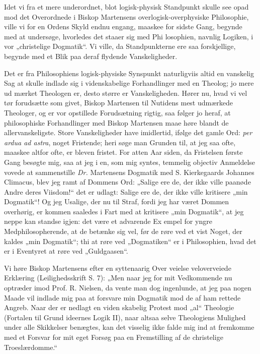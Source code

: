 \documentclass[12pt]{book}
\newcommand{\opage}[1]{\marginnote{\footnotesize\textit{[#1]}}}
\begin{document}
Idet vi fra et mere underordnet, blot logisk-physisk
Standpunkt skulle see opad mod det Overordnede i Biskop
Martensens overlogisk-overphysiske Philosophie, ville vi for
en Ordens Skyld endnu engang, maaskee for sidste Gang,
begynde med at undersøge, hvorledes det staaer sig med Phi\-%
losophien, navnlig Logiken, i vor „christelige Dogmatik“. Vi
ville, da Standpunkterne ere saa forskjellige, begynde med et
Blik paa deraf flydende Vanskeligheder.

Det er fra Philosophiens logisk-physiske Synspunkt
naturligviis altid en vanskelig Sag at skulle indlade sig i
videnskabelige Forhandlinger med en Theolog; jo mere ud\-%
mærket Theologen er, desto større er Vanskeligheden. Hører
nu, hvad vi vel tør forudsætte som givet, Biskop Martensen
til Nutidens mest udmærkede Theologer, og er vor opstillede
Forudsætning rigtig, saa følger jo heraf, at philosophiske
Forhandlinger med Biskop Martensen maae høre blandt de
allervanskeligste. Store Vanskeligheder have imidlertid, ifølge
det gamle Ord: \textit{per ardua ad astra}, noget Fristende; heri
søge man Grunden til, at jeg saa ofte, maaskee altfor ofte,
er bleven fristet. For atten Aar siden, da Fristelsen første
Gang besøgte mig, saa at jeg i en, som mig syntes, temmelig
objectiv Anmeldelse vovede at sammenstille \textit{Dr.} Martensens
Dogmatik med S. Kierkegaards Johannes Climacus, blev
jeg ramt af Dommens Ord: „Salige ere de, der ikke ville
paanøde Andre deres Viisdom!“ det er udlagt: Salige ere
de, der ikke ville kritisere „min Dogmatik“! Og jeg Usalige,
der nu til Straf, fordi jeg har været Dommen overhørig, er
kommen saaledes i Fart med at kritisere „min Dogmatik“,
at jeg neppe kan standse igjen: det være et advarende Ex\-%
\opage{77}\setcounter{footnote}{0}%
empel for yngre Medphilosopherende, at de betænke sig vel,
før de røre ved et vist Noget, der kaldes „min Dogmatik“;
thi at røre ved „Dogmatiken“ er i Philosophien, hvad det er
i Eventyret at røre ved „Guldgaasen“.

Vi høre Biskop Martensens efter en syttenaarig Over\-%
veielse veloverveiede Erklæring (Leilighedsskrift S. 7): „Men
naar jeg for mit Vedkommende nu optræder imod Prof. R.
Nielsen, da vente man dog ingenlunde, at jeg paa nogen
Maade vil indlade mig paa at forsvare min Dogmatik mod
de af ham rettede Angreb. Naar der er nedlagt en viden\-%
skabelig Protest mod „al“ Theologie (Fortalen til Grund\-%
ideernes Logik II), naar altsaa selve Theologiens Mulighed
under alle Skikkelser benægtes, kan det visselig ikke falde
mig ind at fremkomme med et Forsvar for mit eget Forsøg
paa en Fremstilling af de christelige Troeslærdomme.“
\end{document}
